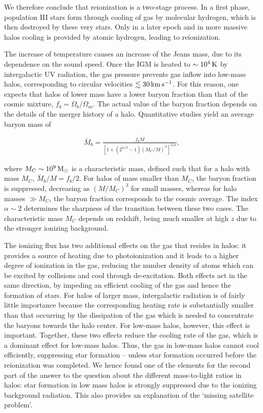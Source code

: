 \documentclass[a4paper,11pt]{article}
\begin{document}
{\noindent}We therefore conclude that reionization is a two-stage process. In a first phase, population III stars form through cooling of gas by molecular hydrogen, which is then destroyed by these very stars. Only in a later epoch and in more massive halos cooling is provided by atomic hydrogen, leading to reionization.

{\noindent}The increase of temperature causes an increase of the Jeans mass, due to its dependence on the sound speed. Once the IGM is heated to $\sim10^4\,{\rm K}$ by intergalactic UV radiation, the gas pressure prevents gas inflow into low-mass halos, corresponding to circular velocities $\lesssim30\,{\rm km\,s^{-1}}$. For this reason, one expects that halos of lower mass have a lower baryon fraction than that of the cosmic mixture, $f_b=\Omega_b/\Omega_m$. The actual value of the baryon fraction depends on the details of the merger history of a halo. Quantitative studies yield an average baryon mass of

\begin{align*}
    \bar{M}_b = \frac{f_b M}{[1+(2^{\alpha/3}-1)(M_C/M)^\alpha]^{3/\alpha}},
\end{align*}

{\noindent}where $M_C\sim10^9\,{\rm M_\odot}$ is a characteristic mass, defined such that for a halo with mass $M_C$, $\bar{M}_b/M=f_b/2$. For halos of mass smaller than $M_C$, the baryon fraction is suppressed, decreasing as $(M/M_C)^3$ for small masses, whereas for halo masses $\gg M_C$, the baryon fraction corresponds to the cosmic average. The index $\alpha\sim2$ determines the sharpness of the transition between these two cases. The characteristic mass $M_C$ depends on redshift, being much smaller at high $z$ due to the stronger ionizing background.

{\noindent}The ionizing flux has two additional effects on the gas that resides in halos: it provides a source of heating due to photoionization and it leads to a higher degree of ionization in the gas, reducing the number density of atoms which can be excited by collisions and cool through de-excitation. Both effects act in the same direction, by impeding an efficient cooling of the gas and hence the formation of stars. For halos of larger mass, intergalactic radiation is of fairly little importance because the corresponding heating rate is substantially smaller than that occurring by the dissipation of the gas which is needed to concentrate the baryons towards the halo center. For low-mass halos, however, this effect is important. Together, these two effects reduce the cooling rate of the gas, which is a dominant effect for low-mass halos. Thus, the gas in low-mass halos cannot cool efficiently, suppressing star formation -- unless star formation occurred before the reionization was completed. We hence found one of the elements for the second part of the answer to the question about the different mass-to-light ratios in halos: star formation in low mass halos is strongly suppressed due to the ionizing background radiation. This also provides an explanation of the `missing satellite problem'.
\end{document}
